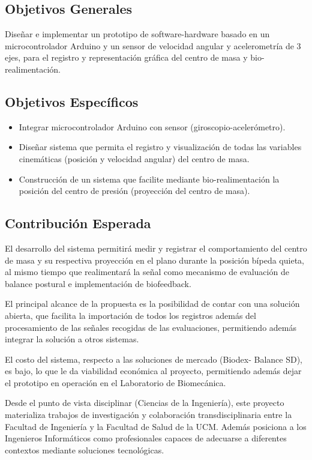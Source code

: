 \documentclass[12pt,a4paper]{article}
\begin{document}
\subsection{Objetivos Generales}
Diseñar e implementar un prototipo de software-hardware basado en un microcontrolador Arduino y un sensor de velocidad angular y acelerometría de 3 ejes, para el registro y representación gráfica del centro de masa y bio-realimentación.

\subsection{Objetivos Específicos}
\begin{itemize}
	\item Integrar microcontrolador Arduino con sensor (giroscopio-acelerómetro).
	\item Diseñar sistema que permita el registro y visualización de todas las variables cinemáticas (posición y velocidad angular) del centro de masa. 
	\item Construcción de un sistema que facilite mediante bio-realimentación la posición del centro de presión (proyección del centro de masa).
\end{itemize}	

\subsection{Contribución Esperada}

El desarrollo del sistema permitirá medir y registrar el comportamiento del centro de masa y su respectiva proyección en el plano durante la posición bípeda quieta, al mismo tiempo que realimentará la señal como mecanismo de evaluación de balance postural e implementación de biofeedback.

El principal alcance de la propuesta es la posibilidad de contar con una solución abierta, que facilita la importación de todos los registros además del procesamiento de las señales recogidas de las evaluaciones, permitiendo además integrar la solución a otros sistemas.

El costo del sistema, respecto a las soluciones de mercado (Biodex- Balance SD), es bajo, lo que le da viabilidad económica al proyecto, permitiendo además dejar el prototipo en operación en el Laboratorio de Biomecánica. 

Desde el punto de vista disciplinar (Ciencias de la Ingeniería), este proyecto materializa trabajos de investigación y colaboración transdisciplinaria entre la Facultad de Ingeniería y la Facultad de Salud de la UCM. Además posiciona a los Ingenieros Informáticos como profesionales capaces de adecuarse a diferentes contextos mediante soluciones tecnológicas.
\end{document}
